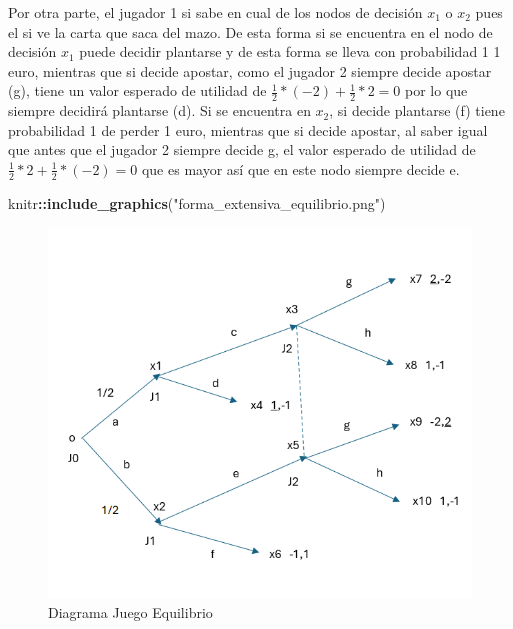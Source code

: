 \documentclass[12pt,a4paper,]{book}
\newenvironment{Shaded}{\begin{snugshade}}{\end{snugshade}}
\newcommand{\FunctionTok}[1]{\textcolor[rgb]{0.13,0.29,0.53}{\textbf{#1}}}
\newcommand{\NormalTok}[1]{#1}
\newcommand{\SpecialCharTok}[1]{\textcolor[rgb]{0.81,0.36,0.00}{\textbf{#1}}}
\newcommand{\StringTok}[1]{\textcolor[rgb]{0.31,0.60,0.02}{#1}}
\numberwithin{dummy}{section}
\theoremstyle{ocrenumbox}
\theoremstyle{blacknumex}
\theoremstyle{blacknumbox}
\theoremstyle{ocrenum}
\theoremstyle{ocrenum}
\begin{document}
Por otra parte, el jugador 1 si sabe en cual de los nodos de decisión
\(x_1\) o \(x_2\) pues el si ve la carta que saca del mazo. De esta
forma si se encuentra en el nodo de decisión \(x_1\) puede decidir
plantarse y de esta forma se lleva con probabilidad 1 1 euro, mientras
que si decide apostar, como el jugador 2 siempre decide apostar (g),
tiene un valor esperado de utilidad de
\(\frac{1}{2}*(-2) +\frac{1}{2}*2 =0\) por lo que siempre decidirá
plantarse (d). Si se encuentra en \(x_2\), si decide plantarse (f) tiene
probabilidad 1 de perder 1 euro, mientras que si decide apostar, al
saber igual que antes que el jugador 2 siempre decide g, el valor
esperado de utilidad de \(\frac{1}{2}*2 +\frac{1}{2}*(-2) =0\) que es
mayor así que en este nodo siempre decide e.

\begin{Shaded}
\begin{Highlighting}[]
\NormalTok{knitr}\SpecialCharTok{::}\FunctionTok{include\_graphics}\NormalTok{(}\StringTok{"forma\_extensiva\_equilibrio.png"}\NormalTok{)}
\end{Highlighting}
\end{Shaded}

\begin{figure}[H]

{\centering \includegraphics[width=0.8\linewidth]{forma_extensiva_equilibrio} 

}

\caption{\label{forma_extensiva_equilibrio}Diagrama Juego Equilibrio}\label{fig:forma_extensiva_equilibrio}
\end{figure}




%
\end{document}
